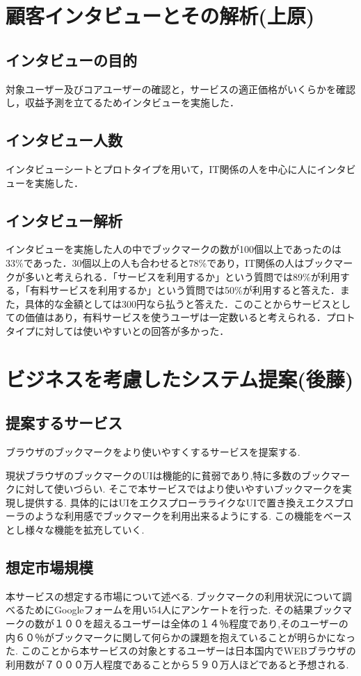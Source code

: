 \documentclass[a4paper,10pt,fleqn]{jsarticle}
\begin{document}
\newpage

\section{顧客インタビューとその解析(上原)}

\subsection{インタビューの目的}
対象ユーザー及びコアユーザーの確認と，サービスの適正価格がいくらかを確認し，収益予測を立てるためインタビューを実施した．

\subsection{インタビュー人数}
インタビューシートとプロトタイプを用いて，IT関係の人を中心に人にインタビューを実施した．

\subsection{インタビュー解析}
インタビューを実施した人の中でブックマークの数が100個以上であったのは33\%であった．30個以上の人も合わせると78\%であり，IT関係の人はブックマークが多いと考えられる．「サービスを利用するか」という質問では89\%が利用する，「有料サービスを利用するか」という質問では50\%が利用すると答えた．また，具体的な金額としては300円なら払うと答えた．このことからサービスとしての価値はあり，有料サービスを使うユーザは一定数いると考えられる．プロトタイプに対しては使いやすいとの回答が多かった．

\section{ビジネスを考慮したシステム提案(後藤)}
\subsection{提案するサービス}
ブラウザのブックマークをより使いやすくするサービスを提案する.
\par
現状ブラウザのブックマークのUIは機能的に貧弱であり,特に多数のブックマークに対して使いづらい. そこで本サービスではより使いやすいブックマークを実現し提供する. 具体的にはUIをエクスプローラライクなUIで置き換えエクスプローラのような利用感でブックマークを利用出来るようにする. この機能をベースとし様々な機能を拡充していく.

\subsection{想定市場規模}
本サービスの想定する市場について述べる.
ブックマークの利用状況について調べるためにGoogleフォームを用い54人にアンケートを行った.
その結果ブックマークの数が１００を超えるユーザーは全体の１４％程度であり,そのユーザーの内６０％がブックマークに関して何らかの課題を抱えていることが明らかになった.
このことから本サービスの対象とするユーザーは日本国内でWEBブラウザの利用数が７０００万人程度であることから５９０万人ほどであると予想される.
\end{document}
